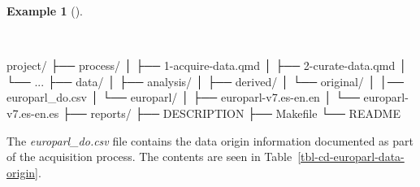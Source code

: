 \documentclass[
  letterpaper,
  DIV=11,
  numbers=noendperiod]{scrreprt}
\newenvironment{Shaded}{\begin{snugshade}}{\end{snugshade}}
\newcommand{\ExtensionTok}[1]{\textcolor[rgb]{0.00,0.00,0.00}{#1}}
\newcommand{\NormalTok}[1]{\textcolor[rgb]{0.00,0.00,0.00}{#1}}
\theoremstyle{definition}
\newtheorem{example}{Example}[chapter]
\theoremstyle{remark}
\begin{document}
\begin{example}[]\protect\hypertarget{exm-cd-europarl-file-structure}{}\label{exm-cd-europarl-file-structure}

~

\begin{Shaded}
\begin{Highlighting}[]
\ExtensionTok{project/}
\ExtensionTok{├──}\NormalTok{ process/}
\ExtensionTok{│}\NormalTok{   ├── 1{-}acquire{-}data.qmd}
\ExtensionTok{│}\NormalTok{   ├── 2{-}curate{-}data.qmd}
\ExtensionTok{│}\NormalTok{   └── ...}
\ExtensionTok{├──}\NormalTok{ data/}
\ExtensionTok{│}\NormalTok{   ├── analysis/}
\ExtensionTok{│}\NormalTok{   ├── derived/}
\ExtensionTok{│}\NormalTok{   └── original/}
\ExtensionTok{│}\NormalTok{       │── europarl\_do.csv}
\ExtensionTok{│}\NormalTok{       └── europarl/}
\ExtensionTok{│}\NormalTok{           ├── europarl{-}v7.es{-}en.en}
\ExtensionTok{│}\NormalTok{           └── europarl{-}v7.es{-}en.es}
\ExtensionTok{├──}\NormalTok{ reports/}
\ExtensionTok{├──}\NormalTok{ DESCRIPTION}
\ExtensionTok{├──}\NormalTok{ Makefile}
\ExtensionTok{└──}\NormalTok{ README}
\end{Highlighting}
\end{Shaded}

\end{example}

The \emph{europarl\_do.csv} file contains the data origin information
documented as part of the acquisition process. The contents are seen in
Table~\ref{tbl-cd-europarl-data-origin}.
\end{document}

